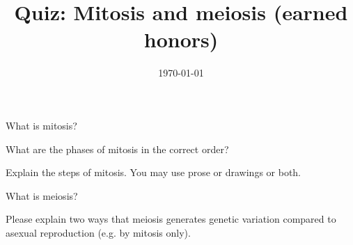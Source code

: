 \documentclass[hw]{exam}
\title{Quiz: Mitosis and meiosis (earned honors)}
\author{\mobeardInstructorShort}
\date{\today}
\begin{document}
\maketitle

\begin{questions}
\question[1] What is mitosis? 
\begin{solution}[1in]
\end{solution}

\question[1] What are the phases of mitosis in the correct order?
\begin{solution}[1in]
\end{solution}

\question[1] Explain the steps of mitosis. You may use prose or drawings or both.
\begin{solution}[1in]
\end{solution}

\question[1] What is meiosis? 
\begin{solution}[1in]
\end{solution}

\question[1] Please explain two ways that meiosis generates genetic variation compared to asexual reproduction (e.g. by mitosis only). 
\begin{solution}[1in]
\end{solution}
\end{questions}
\end{document}

